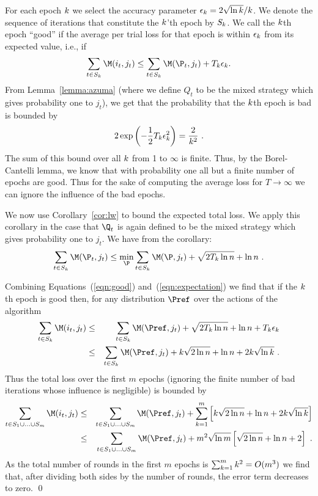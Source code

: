 \proof
For each epoch $k$ we select the accuracy parameter
$\epsilon_{k} = 2 \sqrt{\ln k} / k$. 
We denote the sequence of iterations that constitute the $k$'th
epoch by $S_{k}$. We call the $k$th epoch ``good'' if the
average per trial loss for that epoch is within $\epsilon_{k}$ from its
expected value, i.e., if
\begin{equation} \label{eqn:good}
\sum_{t \in S_{\k}} \M(i_t,j_t) 
\leq
\sum_{t \in S_{\k}} \M(\P_t,j_t) + T_{\k} \epsilon_{\k}.
\end{equation}
From Lemma~\ref{lemma:azuma} (where we define $Q_t$ to be the mixed strategy
which gives probability one to $j_t$),
we get that the probability that the $k$th epoch is bad is bounded by
\[
2 \exp \left( -{1 \over 2} T_{k} \epsilon_{k}^2 \right)
=
{2 \over k^2}~.
\]
The sum of this bound over all $k$ from 1 to $\infty$ is finite. Thus,
by the Borel-Cantelli lemma, we know that with probability one
all but a finite number of epochs are good. Thus for the sake of
computing the
average loss for $T \to \infty$ we can ignore the influence of the bad
epochs.

We now use Corollary~\ref{cor:lw} to bound the expected total
loss.
We apply this corollary in the case that $\Q_t$ is again defined to be
the mixed strategy which gives probability one to $j_t$.
We have from the corollary:
\begin{equation} \label{eqn:expectation}
\sum_{t \in S_{\k}} \M(\P_t,j_t)
\leq
\min_{\P} \sum_{t \in S_{\k}} \M(\P,j_t) + \sqrt{2 T_{\k} \ln n } + {\ln n}~.
\end{equation}

Combining Equations~(\ref{eqn:good}) and~(\ref{eqn:expectation}) we
find that if the $k$th epoch is good then, for any distribution
$\Pref$ over the actions of the algorithm
\begin{eqnarray*}
\sum_{t \in S_{\k}} \M(i_t,j_t) 
&\leq&
 \sum_{t \in S_{\k}} \M(\Pref,j_t) 
 + \sqrt{2 T_{\k} \ln n } + {\ln n} + T_{\k} \epsilon_{\k} \\
&\leq& 
 \sum_{t \in S_{\k}} \M(\Pref,j_t) 
+ {\k \sqrt{2 \ln n}} + {\ln n} + 2 \k \sqrt{\ln \k}~.
\end{eqnarray*}
Thus the total loss over the first $m$ epochs (ignoring the finite
number of bad iterations whose influence is negligible) is bounded by
\begin{eqnarray*}
\sum_{t \in S_1 \cup \ldots \cup S_m} \M(i_t,j_t) & \leq &
\sum_{t \in S_1 \cup \ldots \cup S_m} \M(\Pref,j_t) 
+ \sum_{\k=1}^m 
  \left[{\k \sqrt{2 \ln n}} + {\ln n} + 2 \k \sqrt{\ln \k} \right] \\
& \leq &
 \sum_{t \in S_1 \cup \ldots \cup S_m} \M(\Pref,j_t) 
+m^2 \sqrt{\ln m} \left[\sqrt{2 \ln n} + {\ln n} + 2 \right]~.
\end{eqnarray*}
As the total number of rounds in the first $m$ epochs is
$\sum_{k=1}^m k^2 = O(m^3)$ we find that, after dividing both sides by
the number of rounds, the error term decreases to zero.
\qed


